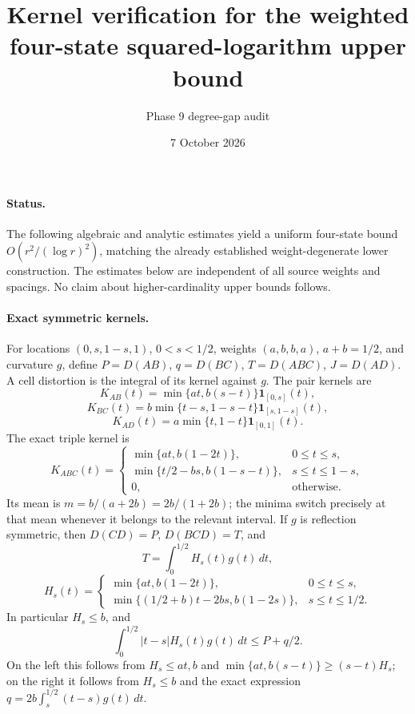 \documentclass[11pt]{article}
\begin{document}
\title{Kernel verification for the weighted four-state squared-logarithm upper bound}
\author{Phase 9 degree-gap audit}
\date{7 October 2026}
\maketitle

\paragraph{Status.}
The following algebraic and analytic estimates yield a uniform four-state bound
$O(r^2/(\log r)^2)$, matching the already established weight-degenerate
lower construction. The estimates below are independent of all source
weights and spacings. No claim about higher-cardinality upper bounds follows.

\paragraph{Exact symmetric kernels.}
For locations $(0,s,1-s,1)$, $0<s<1/2$, weights $(a,b,b,a)$,
$a+b=1/2$, and curvature $g$, define $P=D(AB)$, $q=D(BC)$,
$T=D(ABC)$, $J=D(AD)$. A cell distortion is the integral of its
kernel against $g$. The pair kernels are
\[
 K_{AB}(t)=\min\{at,b(s-t)\}\mathbf1_{[0,s]}(t),
\]
\[
 K_{BC}(t)=b\min\{t-s,1-s-t\}\mathbf1_{[s,1-s]}(t),
\]
\[
 K_{AD}(t)=a\min\{t,1-t\}\mathbf1_{[0,1]}(t).
\]
The exact triple kernel is
\[
 K_{ABC}(t)=
 \begin{cases}
 \min\{at,b(1-2t)\},&0\le t\le s,\\
 \min\{t/2-bs,b(1-s-t)\},&s\le t\le1-s,\\
 0,&\text{otherwise}.
 \end{cases}
\]
Its mean is $m=b/(a+2b)=2b/(1+2b)$; the minima switch precisely
at that mean whenever it belongs to the relevant interval. If $g$ is
reflection symmetric, then $D(CD)=P$, $D(BCD)=T$, and
\[
 T=\int_0^{1/2}H_s(t)g(t)\,dt,
\]
\[
 H_s(t)=
 \begin{cases}
 \min\{at,b(1-2t)\},&0\le t\le s,\\
 \min\{(1/2+b)t-2bs,b(1-2s)\},&s\le t\le1/2.
 \end{cases}
\]
In particular $H_s\le b$, and
\[
 \int_0^{1/2}|t-s|H_s(t)g(t)\,dt\le P+q/2.
\]
On the left this follows from $H_s\le at,b$ and
$\min\{at,b(s-t)\}\ge(s-t)H_s$; on the right it follows
from $H_s\le b$ and the exact expression
$q=2b\int_s^{1/2}(t-s)g(t)\,dt$.
\end{document}
